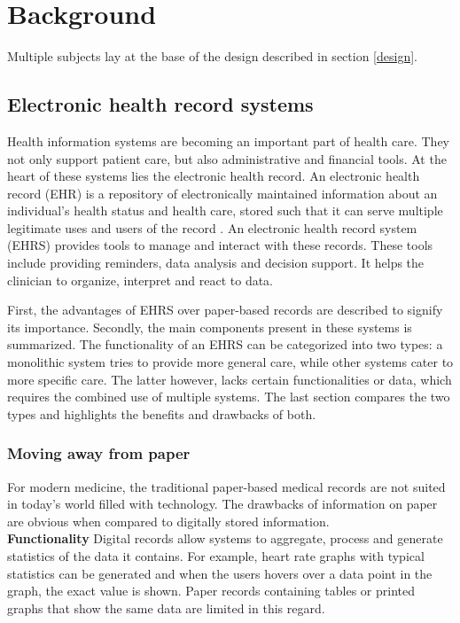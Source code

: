 \section{Background} \label{background}

Multiple subjects lay at the base of the design described in section \ref{design}.

    \subsection{Electronic health record systems}

    Health information systems are becoming an important part of health care. They not only support patient care, but also administrative and financial tools. At the heart of these systems lies the electronic health record. An electronic health record (EHR) is a repository of electronically maintained information about an individual's health status and health care, stored such that it can serve multiple legitimate uses and users of the record \cite{biomedical_informatics}. An electronic health record system (EHRS) provides tools to manage and interact with these records. These tools include providing reminders, data analysis and decision support. It helps the clinician to organize, interpret and react to data.

    First, the advantages of EHRS over paper-based records are described to signify its importance. Secondly, the main components present in these systems is summarized. The functionality of an EHRS can be categorized into two types: a monolithic system tries to provide more general care, while other systems cater to more specific care. The latter however, lacks certain functionalities or data, which requires the combined use of multiple systems. The last section compares the two types and highlights the benefits and drawbacks of both.

        \subsubsection{Moving away from paper} \label{2_ehrs_paper}

        For modern medicine, the traditional paper-based medical records are not suited in today's world filled with technology. The drawbacks of information on paper are obvious when compared to digitally stored information.\\

        \noindent\textbf{Functionality} Digital records allow systems to aggregate, process and generate statistics of the data it contains. For example, heart rate graphs with typical statistics can be generated and when the users hovers over a data point in the graph, the exact value is shown. Paper records containing tables or printed graphs that show the same data are limited in this regard.

